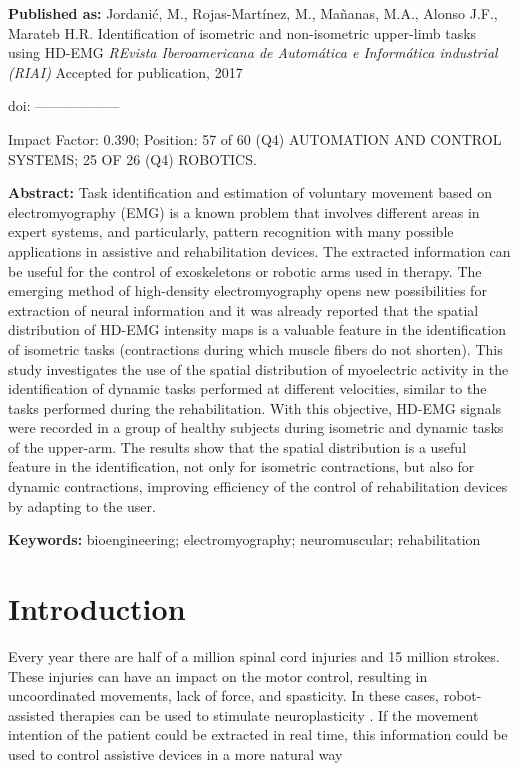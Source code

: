 \documentclass{article}
\begin{document}
\label{ch:p4}
\textbf{Published as:} 
Jordani\'c, M., Rojas-Mart\'inez, M., Ma\~nanas, M.A., Alonso J.F., Marateb H.R.
Identification of isometric and non-isometric upper-limb tasks using HD-EMG 
\textit{REvista Iberoamericana de Autom\'atica e Inform\'atica industrial (RIAI)} Accepted for publication, 2017

doi: ------------------

Impact Factor: 0.390; Position: 57 of 60 (Q4) AUTOMATION AND CONTROL SYSTEMS; 25 OF 26 (Q4) ROBOTICS.


\textbf{Abstract:} Task identification and estimation of voluntary movement based on electromyography (EMG) is a known problem that involves different areas in expert systems, and particularly, pattern recognition with many possible applications in assistive and rehabilitation devices. The extracted information can be useful for the control of exoskeletons or robotic arms used in therapy. The emerging method of high-density electromyography opens new possibilities for extraction of neural information and it was already reported that the spatial distribution of HD-EMG intensity maps is a valuable feature in the identification of isometric tasks (contractions during which muscle fibers do not shorten). This study investigates the use of the spatial distribution of myoelectric activity in the identification of dynamic tasks performed at different velocities, similar to the tasks performed during the rehabilitation. With this objective, HD-EMG signals were recorded in a group of healthy subjects during isometric and dynamic tasks of the upper-arm. The results show that the spatial distribution is a useful feature in the identification, not only for isometric contractions, but also for dynamic contractions, improving efficiency of the control of rehabilitation devices by adapting to the user.

\textbf{Keywords:}  bioengineering; electromyography; neuromuscular; rehabilitation

\section{Introduction}
Every year there are half of a million spinal cord injuries and 15 million strokes. These injuries can have an impact on the motor control, resulting in uncoordinated movements, lack of force, and spasticity. In these cases, robot-assisted therapies can be used to stimulate neuroplasticity \citep{vanPeppen2004}. If the movement intention of the patient could be extracted in real time, this information could be used to control assistive devices in a more natural way
\end{document}

